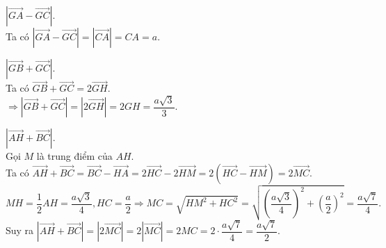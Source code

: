\begin{bt}
{\begin{listEX}
			\item $\left|\overrightarrow{GA}-\overrightarrow{GC}\right|$.\\
			Ta có $\left|\overrightarrow{GA}-\overrightarrow{GC}\right|=\left|\overrightarrow{CA}\right|=CA=a$.	
			\item $\left|\overrightarrow{GB}+\overrightarrow{GC}\right|$.\\
			Ta có $\overrightarrow{GB}+\overrightarrow{GC}=2\overrightarrow{GH}$.\\
			$\Rightarrow \left|\overrightarrow{GB}+\overrightarrow{GC}\right|=\left|2\overrightarrow{GH}\right|=2GH=\dfrac{a\sqrt{3}}{3}$.
			\item $\left|\overrightarrow{AH}+\overrightarrow{BC}\right|$.\\
			Gọi $M$ là trung điểm của $AH$.\\
			Ta có $\overrightarrow{AH}+\overrightarrow{BC}=\overrightarrow{BC}-\overrightarrow{HA}=2\overrightarrow{HC}-2\overrightarrow{HM}=2\left(\overrightarrow{HC}-\overrightarrow{HM}\right)=2\overrightarrow{MC}$.\\ 
			\[MH=\dfrac{1}{2}AH=\dfrac{a\sqrt{3}}{4}, HC=\dfrac{a}{2}\Rightarrow MC=\sqrt{HM^2+HC^2}=\sqrt{\left(\dfrac{a\sqrt{3}}{4}\right)^2+\left(\dfrac{a}{2}\right)^2}=\dfrac{a\sqrt{7}}{4}.\]
			Suy ra $\left|\overrightarrow{AH}+\overrightarrow{BC}\right|=\left|2\overrightarrow{MC}\right|=2\left|\overrightarrow{MC}\right|=2MC=2\cdot \dfrac{a\sqrt{7}}{4}=\dfrac{a\sqrt{7}}{2}$.
		\end{listEX}
	}
\end{bt}

